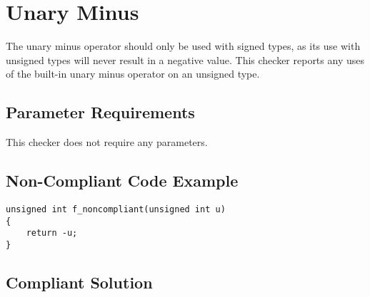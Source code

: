 %
%

\section{Unary Minus}
\label{UnaryMinus::overview}

The unary minus operator should only be used with signed types, as its use
with unsigned types will never result in a negative value. This checker
reports any uses of the built-in unary minus operator on an unsigned type.

\subsection{Parameter Requirements}

This checker does not require any parameters.

\subsection{Non-Compliant Code Example}

\begin{verbatim}
unsigned int f_noncompliant(unsigned int u)
{
    return -u;
}
\end{verbatim}

\subsection{Compliant Solution}

